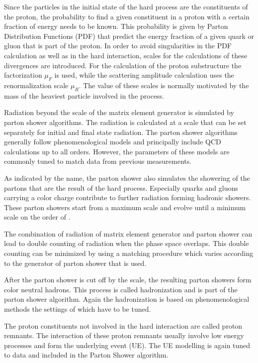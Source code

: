 Since the particles in the initial state of the hard process are the constituents of the proton, the probability to find a given constituent in a proton with a certain fraction of energy needs to be known.
This probability is given by Parton Distribution Functions (PDF) that predict the energy fraction of a given quark or gluon that is part of the proton.
In order to avoid singularities in the PDF calculation as well as in the hard interaction, scales for the calculations of these divergences are introduced.
For the calculation of the proton substructure the factorization $\mu_F$ is used, while the scattering amplitude calculation uses the renormalization scale $\mu_R$.
The value of these scales is normally motivated by the mass of the heaviest particle involved in the process.

Radiation beyond the scale of the matrix element generator is simulated by parton shower algorithms.
The radiation is calculated at a scale that can be set separately for initial and final state radiation. 
The parton shower algorithms generally follow phenomenological models and principally include QCD calculations up to all orders.
However, the parameters of these models are commonly tuned to match data from previous measurements.

As indicated by the name, the parton shower also simulates the showering of the partons that are the result of the hard process.
Especially quarks and gluons carrying a color charge contribute to further radiation forming hadronic showers.
These parton showers start from a maximum scale and evolve until a minimum scale on the order of \GeV. 

The combination of radiation of matrix element generator and parton shower can lead to double counting of radiation when the phase space overlaps.
This double counting can be minimized by using a matching procedure which varies according to the generator of parton shower that is used.

After the parton shower is cut off by the scale, the resulting parton showers form color neutral hadrons.
This process is called hadronization and is part of the parton shower algorithm.
Again the hadronization is based on phenomenological methods the settings of which have to be tuned.

The proton constituents not involved in the hard interaction are called proton remnants. The interaction of these proton remnants usually involve low energy processes and form the underlying
event (UE). The UE modelling is again tuned to data and included in the Parton Shower algorithm.

